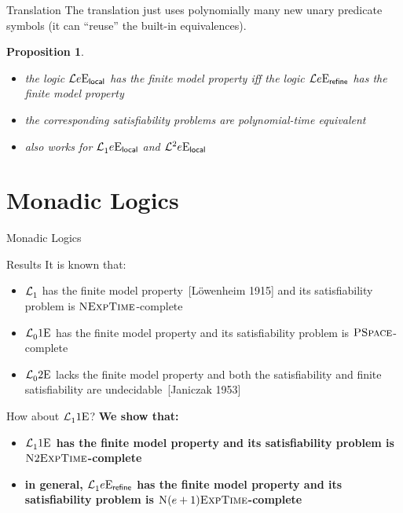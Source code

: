 \documentclass{beamer}
\newtheorem{proposition}{Proposition}
\begin{document}
\begin{frame}{Translation}
The translation just uses polynomially many new unary predicate symbols (it can
``reuse'' the built-in equivalences).
\begin{proposition}
\begin{itemize}
  \item
  the logic $\mathcal{L}{e}\mathrm{E}_{\mathsf{local}}$ has the finite model property iff
  the logic $\mathcal{L}{e}\mathrm{E}_{\mathsf{refine}}$ has the finite model property
  
  \item
  the corresponding satisfiability problems are polynomial-time equivalent
  
  \item
  also works for $\mathcal{L}^{{}}_{1}{e}\mathrm{E}_{\mathsf{local}}$ and
  $\mathcal{L}^{2}_{{}}{e}\mathrm{E}_{\mathsf{local}}$
\end{itemize}
\end{proposition}
\end{frame}

\section{Monadic Logics}
\begin{frame}

{\LARGE Monadic Logics}
\end{frame}
\begin{frame}{Results}
It is known that:
\begin{itemize}
  \item
  $\mathcal{L}^{{}}_{1}$ has the finite model property~{[L{\"o}wenheim 1915]} and
  its satisfiability problem is $\text{\normalfont{\scshape NExpTime}}$-complete
  
  \pause
  \item
  $\mathcal{L}^{{}}_{0}{1}\mathrm{E}_{{}}$ has the finite model property and
  its satisfiability problem is $\text{\normalfont{\scshape PSpace}}$-complete
  
  \pause
  \item
  $\mathcal{L}^{{}}_{0}{2}\mathrm{E}_{{}}$ lacks the finite model property
  and both the satisfiability and finite satisfiability are
  undecidable~{[Janiczak 1953]}
\end{itemize}

\pause
How about $\mathcal{L}^{{}}_{1}{1}\mathrm{E}_{{}}$?
\pause
\textbf{We show that:}
\begin{itemize}
  \item\textbf{
  $\mathcal{L}^{{}}_{1}{1}\mathrm{E}_{{}}$ has the finite model property and its
  satisfiability problem is $\text{\normalfont{\scshape N}}2\text{\normalfont{\scshape ExpTime}}$-complete}
  
  \item\textbf{
  in general, $\mathcal{L}^{{}}_{1}{e}\mathrm{E}_{\mathsf{refine}}$ has the finite model property and
  its satisfiability problem is $\text{\normalfont{\scshape N}}(e+1)\text{\normalfont{\scshape ExpTime}}$-complete}
\end{itemize}
\end{frame}
\end{document}
